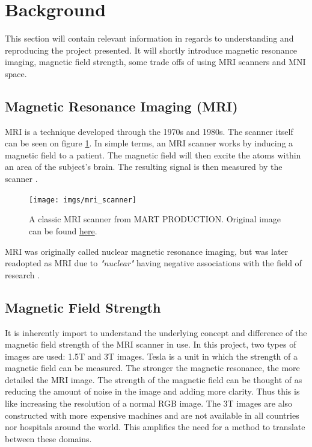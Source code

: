\documentclass[11pt, fleqn, titlepage]{article}
\newcommand{\1}[1]{\mathds{1}\left[#1\right]}
\begin{document}
\section{Background}

This section will contain relevant information in regards to understanding and reproducing the project presented. It will shortly introduce magnetic resonance imaging, magnetic field strength, some trade offs of using MRI scanners and MNI space. 

\subsection{Magnetic Resonance Imaging (MRI)}
MRI is a technique developed through the 1970s and 1980s. The scanner itself can be seen on figure \ref{fig:mriscanner}. In simple terms, an MRI scanner works by inducing a magnetic field to a patient. The magnetic field will then excite the atoms within an area of the subject's brain. The resulting signal is then measured by the scanner \cite{mri}.  
\begin{figure}[H]
	\centering
	\texttt{[image: imgs/mri\_scanner]}
	\caption{A classic MRI scanner from MART PRODUCTION. Original image can be found \href{https://www.pexels.com/photo/technology-hospital-medicine-indoors-7089017/}{here}. }
	\label{fig:mriscanner}
\end{figure}
\noindent
MRI was originally called nuclear magnetic resonance imaging, but was later readopted as MRI due to \textit{"nuclear"} having negative associations with the field of research \cite{wiki} \cite{mri2}.

\subsection{Magnetic Field Strength}
It is inherently import to understand the underlying concept and difference of the magnetic field strength of the MRI scanner in use. In this project, two types of images are used: 1.5T and 3T images. Tesla is a unit in which the strength of a magnetic field can be measured. The stronger the magnetic resonance, the more detailed the MRI image. The strength of the magnetic field can be thought of as reducing the amount of noise in the image and adding more clarity. Thus this is like increasing the resolution of a normal RGB image. The 3T images are also constructed with more expensive machines and are not available in all countries nor hospitals around the world. This amplifies the need for a method to translate between these domains. 
\end{document}
